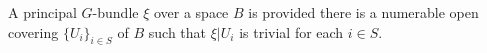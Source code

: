 A principal $G$-bundle $\xi$ over a space $B$ is  provided there is a numerable open covering $\{U_i\}_{i \in S}$ of $B$ such that $\xi|U_i$ is trivial for each $i \in S$.
